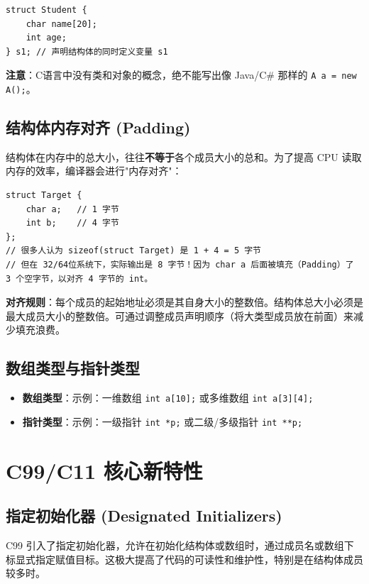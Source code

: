\begin{lstlisting}[caption={结构体定义示例}]
struct Student {
    char name[20];
    int age;
} s1; // 声明结构体的同时定义变量 s1
\end{lstlisting}

\textbf{注意}：C语言中没有类和对象的概念，绝不能写出像 Java/C\# 那样的 \texttt{A a = new A();}。

\subsection{结构体内存对齐 (Padding)}

结构体在内存中的总大小，往往\textbf{不等于}各个成员大小的总和。为了提高 CPU 读取内存的效率，编译器会进行"内存对齐"：

\begin{lstlisting}[caption={内存对齐示例}]
struct Target {
    char a;   // 1 字节
    int b;    // 4 字节
};
// 很多人认为 sizeof(struct Target) 是 1 + 4 = 5 字节
// 但在 32/64位系统下，实际输出是 8 字节！因为 char a 后面被填充（Padding）了 3 个空字节，以对齐 4 字节的 int。
\end{lstlisting}

\textbf{对齐规则}：每个成员的起始地址必须是其自身大小的整数倍。结构体总大小必须是最大成员大小的整数倍。可通过调整成员声明顺序（将大类型成员放在前面）来减少填充浪费。

\subsection{数组类型与指针类型}

\begin{itemize}
    \item \textbf{数组类型}：示例：一维数组 \texttt{int a[10];} 或多维数组 \texttt{int a[3][4];}
    \item \textbf{指针类型}：示例：一级指针 \texttt{int *p;} 或二级/多级指针 \texttt{int **p;}
\end{itemize}

\section{C99/C11 核心新特性}

\subsection{指定初始化器 (Designated Initializers)}

C99 引入了指定初始化器，允许在初始化结构体或数组时，通过成员名或数组下标显式指定赋值目标。这极大提高了代码的可读性和维护性，特别是在结构体成员较多时。

